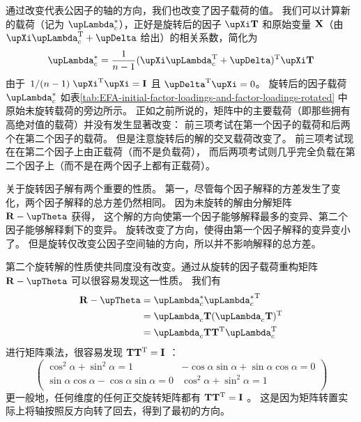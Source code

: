通过改变代表公因子的轴的方向，我们也改变了因子载荷的值。
我们可以计算新的载荷（记为 $ \vLambda_c^* $），正好是旋转后的因子 $ \vXi\vT $ 
和原始变量 $ \mathbf{X} $（由 $ \vXi\vLambda_c\T + \vDelta $ 给出）的相关系数，简化为
\begin{equation}
    \vLambda_c^* = \frac{1}{n-1}(\vXi\vLambda_c\T+\vDelta)\T\vXi\vT
\end{equation}
由于 $ \hfrac{1}{(n-1)}\vXi\T\vXi = \vI $ 且 $ \vDelta\T\vXi = 0 $。
旋转后的因子载荷 $ \vLambda_c^* $ 如表\ref{tab:EFA-initial-factor-loadings-and-factor-loadings-rotated}
中原始未旋转载荷的旁边所示。
正如之前所说的，矩阵中的主要载荷（即那些拥有高绝对值的载荷）并没有发生显著改变：
前三项考试在第一个因子的载荷和后两个在第二个因子的载荷。
但是注意旋转后的解的交叉载荷改变了。
前三项考试现在在第二个因子上由正载荷（而不是负载荷），
而后两项考试则几乎完全负载在第二个因子上（而不是在两个因子上都有正载荷）。

关于旋转因子解有两个重要的性质。
第一，尽管每个因子解释的方差发生了变化，两个因子解释的总方差仍然相同。
因为未旋转的解由分解矩阵 $ \vR - \vTheta $ 获得，
这个解的方向使第一个因子能够解释最多的变异、第二个因子能够解释剩下的变异。
旋转改变了方向，使得由第一个因子解释的变异变小了。
但是旋转仅改变公因子空间轴的方向，所以并不影响解释的总方差。

第二个旋转解的性质使共同度没有改变。通过从旋转的因子载荷重构矩阵 $ \vR - \vTheta $ 可以很容易发现这一性质。
我们有
\begin{align}
    \begin{split}
        \vR - \vTheta & = \vLambda_c^*{\vLambda_c^*}\T \\ 
        & = \vLambda_c\vT(\vLambda_c\vT)\T \\ 
        & = \vLambda_c\vT\vT\T\vLambda_c\T \\ 
    \end{split}
\end{align}
进行矩阵乘法，很容易发现 $ \mathbf{T}\mathbf{T}^\mathrm{T} = \mathbf{I} $ ：
\begin{equation}
    \begin{pmatrix}
        \cos^2\alpha + \sin^2\alpha = 1 & -\cos\alpha\sin\alpha + \sin\alpha\cos\alpha = 0 \\ 
        \sin\alpha\cos\alpha - \cos\alpha\sin\alpha = 0 & \cos^2\alpha + \sin^2\alpha = 1 \\ 
    \end{pmatrix}
\end{equation}
更一般地，任何维度的任何正交旋转矩阵都有 $ \mathbf{T}\mathbf{T}^\mathrm{T} = \mathbf{I} $ 。
这是因为矩阵转置实际上将轴按照反方向转了回去，得到了最初的方向。

